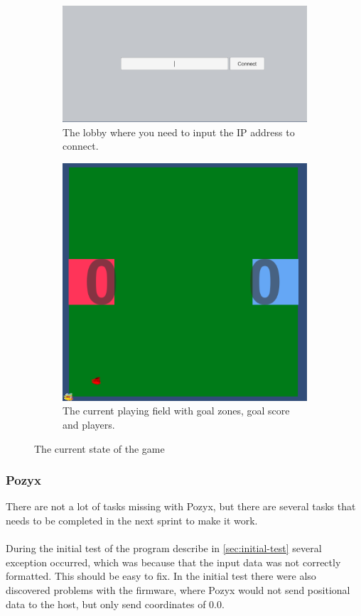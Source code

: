 \begin{figure}[H]
    \centering
    \begin{subfigure}{.5\textwidth}
        \centering
        \includegraphics[width=1\linewidth]{figures/sprint-4-lobby.PNG}
        \caption{The lobby where you need to input the IP address to connect.}
        \label{fig:sprint-4-lobby}
    \end{subfigure}
    \begin{subfigure}{.4\textwidth}
        \centering
        \includegraphics[width=.8\linewidth]{figures/sprint-4-game.PNG}
        \caption{The current playing field with goal zones, goal score and players.}
        \label{fig:sprint-4-game}
    \end{subfigure}
    \caption{The current state of the game}
    \label{fig:sprint-4-state-of-game}
\end{figure}

\subsubsection{Pozyx}
There are not a lot of tasks missing with Pozyx, but there are several tasks that needs to be completed in the next sprint to make it work.
\\\\
During the initial test of the program describe in \autoref{sec:initial-test} several exception occurred, which was because that the input data was not correctly formatted.
This should be easy to fix.
In the initial test there were also discovered problems with the firmware, where Pozyx would not send positional data to the host, but only send coordinates of 0.0.

